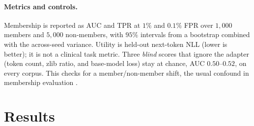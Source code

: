 \documentclass[11pt]{article}
\theoremstyle{plain}
\theoremstyle{definition}
\begin{document}
\paragraph{Metrics and controls.}
Membership is reported as AUC and TPR at $1\%$ and $0.1\%$ FPR over $1{,}000$ members and $5{,}000$ non-members, with $95\%$ intervals from a bootstrap combined with the across-seed variance.
Utility is held-out next-token NLL (lower is better); it is not a clinical task metric.
Three \emph{blind} scores that ignore the adapter (token count, zlib ratio, and base-model loss) stay at chance, AUC $0.50$--$0.52$, on every corpus. This checks for a member/non-member shift, the usual confound in membership evaluation \citep{duan2024mia}.

\section{Results}\label{sec:results}
\end{document}
